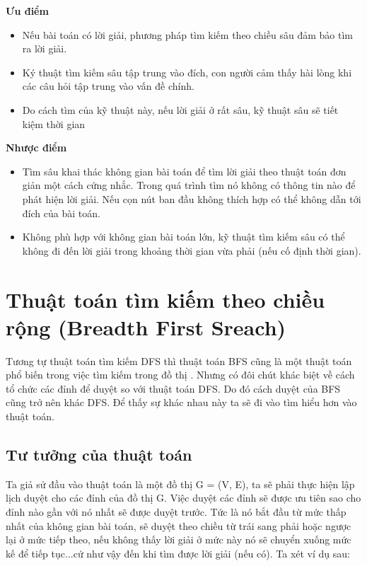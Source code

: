 \textbf{Ưu điểm}
\begin{itemize}
	\item Nếu bài toán có lời giải, phương pháp tìm kiếm theo chiều sâu đảm bảo tìm
	ra lời giải.
	\item Ký thuật tìm kiếm sâu tập trung vào đích, con người cảm thấy hài lòng khi
	các câu hỏi tập trung vào vấn đề chính.
	\item Do cách tìm của kỹ thuật này, nếu lời giải ở rất sâu, kỹ thuật sâu sẽ tiết
	kiệm thời gian
\end{itemize}

\textbf{Nhược điểm}
\begin{itemize}
	\item Tìm sâu khai thác không gian bài toán để tìm lời giải theo thuật toán đơn
	giản một cách cứng nhắc. Trong quá trình tìm nó không có thông tin nào để
	phát hiện lời giải. Nếu cọn nút ban đầu không thích hợp có thể không dẫn
	tới đích của bài toán.
	\item Không phù hợp với không gian bài toán lớn, kỹ thuật tìm kiếm sâu có thể
	không đi đến lời giải trong khoảng thời gian vừa phải (nếu cố định thời
	gian).
\end{itemize}



\section{Thuật toán tìm kiếm theo chiều rộng (Breadth First Sreach)}
Tương tự thuật toán tìm kiếm DFS thì thuật toán BFS cũng là một thuật toán phổ
biến trong việc tìm kiếm trong đồ thị \cite{tl1}. Nhưng có đôi chút khác biệt về cách tổ chức
các đỉnh để duyệt so với thuật toán DFS. Do đó cách duyệt của BFS cũng trở nên
khác DFS. Để thấy sự khác nhau này ta sẽ đi vào tìm hiểu hơn vào thuật toán.

\subsection{Tư tưởng của thuật toán}
Ta giả sử đầu vào thuật toán là một đồ thị G = (V, E), ta sẽ phải thực hiện lập lịch
duyệt cho các đỉnh của đồ thị G. Việc duyệt các đỉnh sẽ được ưu tiên sao cho đỉnh
nào gần với nó nhất sẽ được duyệt trước. Tức là nó bắt đầu từ mức thấp nhất của
không gian bài toán, sẽ duyệt theo chiều từ trái sang phải hoặc ngược lại ở mức
tiếp theo, nếu không thấy lời giải ở mức này nó sẽ chuyển xuống mức kế để tiếp
tục...cứ như vậy đến khi tìm được lời giải (nếu có). Ta xét ví dụ sau:

